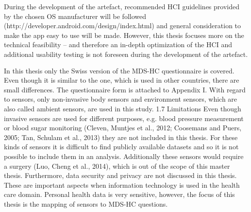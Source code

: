 During the development of the artefact, recommended HCI guidelines provided by the chosen OS manufacturer will be followed (http://developer.android.com/design/index.html) and general consideration to make the app easy to use will be made. However, this thesis focuses more on the technical feasibility – and therefore an in-depth optimization of the HCI and additional usability testing is not foreseen during the development of the artefact.




In this thesis only the Swiss version of the MDS-HC questionnaire is covered. Even though it is similar to the one, which is used in other countries, there are small differences. The questionnaire form is attached to Appendix I.
With regard to sensors, only non-invasive body sensors and environment sensors, which are also called ambient sensors, are used in this study.
1.7 Limitations
Even though invasive sensors are used for different purposes, e.g. blood pressure measurement or blood sugar monitoring (Cleven, Muntjes et al., 2012; Coosemans and Puers, 2005; Tan, Schulam et al., 2013) they are not included in this thesis. For these kinds of sensors it is difficult to find publicly available datasets and so it is not possible to include them in an analysis. Additionally these sensors would require a surgery (Luo, Cheng et al., 2014), which is out of the scope of this master thesis.
Furthermore, data security and privacy are not discussed in this thesis. These are important aspects when information technology is used in the health care domain. Personal health data is very sensitive, however, the focus of this thesis is the mapping of sensors to MDS-HC questions.








